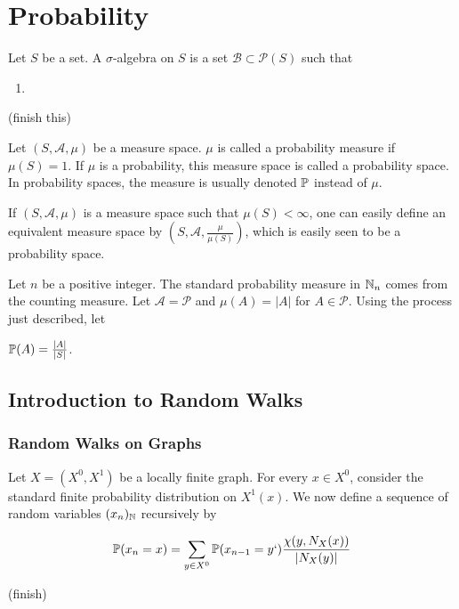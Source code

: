 \chapter{Probability}

\begin{definition}
	Let $S$ be a set. A $\sigma$-algebra on $S$ is a set $\mathcal{B} \subset \mathcal{P}(S)$ such that 
	
	\begin{enumerate}
		\item 
	\end{enumerate}
\end{definition}
(finish this)

\begin{definition}
	Let $(S, \mathcal{A}, \mu)$ be a measure space. $\mu$ is called a probability measure if $\mu(S) = 1$. If $\mu$ is a probability, this measure space is called a probability space. In probability spaces, the measure is usually denoted $\mathbb{P}$ instead of $\mu$.
\end{definition}

If $(S, \mathcal{A}, \mu)$ is a measure space such that $\mu(S) < \infty$, one can easily define an equivalent measure space by $(S, \mathcal{A}, \frac{\mu}{\mu(S)})$, which is easily seen to be a probability space.

\begin{exmp}
	Let $n$ be a positive integer. The standard probability measure in $\mathbb{N}_n$ comes from the counting measure. Let $\mathcal{A} = \mathcal{P}$ and $\mu(A) = |A|$ for $A \in \mathcal{P}$. Using the process just described, let 
	
	\begin{center}
		$\mathbb{P}(A) = \frac{|A|}{|S|}$.
	\end{center}
	

\end{exmp}

\section{Introduction to Random Walks}

\subsection{Random Walks on Graphs}
Let $X = (X^0, X^1)$ be a locally finite graph. For every $x \in X^0$, consider the standard finite probability distribution on $X^1(x)$. We now define a sequence of random variables $(x_n)_{\mathbb{N}}$ recursively by 

\begin{center}
	$$\mathbb{P}(x_n = x) = \sum_{y \in X^0} \mathbb{P}(x_{n-1} = y`)  \frac{\chi(y, N_X(x))}{|N_X(y)|}   $$ 
\end{center}
(finish)






